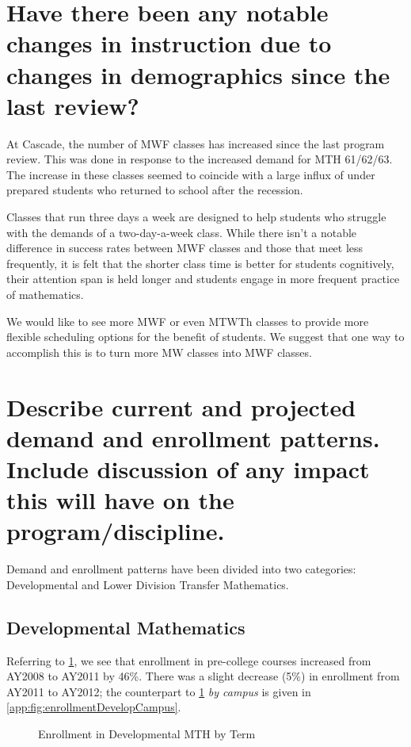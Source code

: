 \section{Have there been any notable changes in instruction due to changes in
demographics since the last review?}
At Cascade, the number of MWF classes has increased since the last program
review. This was done in response to the increased demand for MTH 61/62/63. The
increase in these classes seemed to coincide with a large influx of
under prepared students who returned to school after the recession.

Classes that run three days a week are designed to help students who struggle
with the demands of a two-day-a-week class.  While there isn't a notable
difference in success rates between MWF classes and those that meet less
frequently, it is felt that the shorter class time is better for students
cognitively, their attention span is held longer and students engage in more
frequent practice of mathematics.  

We would like to see more MWF or even MTWTh classes to provide more flexible
scheduling options for the benefit of students. We suggest that one way to
accomplish this is to turn more MW classes into MWF classes.

\section{Describe current and projected demand and enrollment patterns.
  Include discussion of any impact this will have on the program/discipline.
}
Demand and enrollment patterns have been divided into two categories:
Developmental and Lower Division Transfer Mathematics.

\subsection{Developmental Mathematics}
Referring to \cref{needs:fig:enrollmentDevelopTerm}, we see that 
enrollment in pre-college courses increased from AY2008 to AY2011 by 46\%.
There was a slight decrease (5\%) in enrollment from AY2011 to AY2012; the counterpart 
to \cref{needs:fig:enrollmentDevelopTerm} \emph{by campus} is given in \vref{app:fig:enrollmentDevelopCampus}.

\begin{figure}[!htb]
	\centering
	
	\caption{Enrollment in Developmental MTH by Term}
	\label{needs:fig:enrollmentDevelopTerm}
\end{figure}

